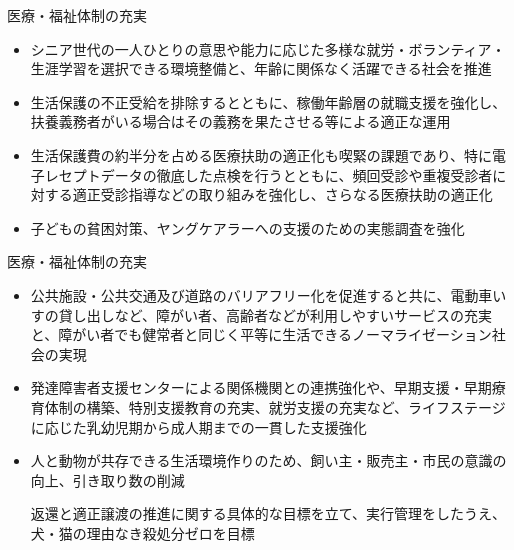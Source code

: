 \documentclass[dvipdfmx]{beamer}
\begin{document}
    \begin{frame}{医療・福祉体制の充実}{}
        \begin{small}
            \begin{itemize}
                \setlength{\parsep}{.5mm}
                \setlength{\itemsep}{2mm}
                \item シニア世代の一人ひとりの意思や能力に応じた多様な就労・ボランティア・生涯学習を選択できる環境整備と、年齢に関係なく活躍できる社会を推進
                \item 生活保護の不正受給を排除するとともに、稼働年齢層の就職支援を強化し、扶養義務者がいる場合はその義務を果たさせる等による適正な運用
                \item 生活保護費の約半分を占める医療扶助の適正化も喫緊の課題であり、特に電子レセプトデータの徹底した点検を行うとともに、頻回受診や重複受診者に対する適正受診指導などの取り組みを強化し、さらなる医療扶助の適正化
                \item 子どもの貧困対策、ヤングケアラーへの支援のための実態調査を強化
            \end{itemize}
        \end{small}
    \end{frame}

    \begin{frame}{医療・福祉体制の充実}{}
        \begin{small}
            \begin{itemize}
                \setlength{\parsep}{.5mm}
                \setlength{\itemsep}{2mm}
                \item 公共施設・公共交通及び道路のバリアフリー化を促進すると共に、電動車いすの貸し出しなど、障がい者、高齢者などが利用しやすいサービスの充実と、障がい者でも健常者と同じく平等に生活できるノーマライゼーション社会の実現
                \item 発達障害者支援センターによる関係機関との連携強化や、早期支援・早期療育体制の構築、特別支援教育の充実、就労支援の充実など、ライフステージに応じた乳幼児期から成人期までの一貫した支援強化
                \item 人と動物が共存できる生活環境作りのため、飼い主・販売主・市民の意識の向上、引き取り数の削減\par
                返還と適正譲渡の推進に関する具体的な目標を立て、実行管理をしたうえ、犬・猫の理由なき殺処分ゼロを目標
            \end{itemize}
        \end{small}
    \end{frame}
\end{document}
